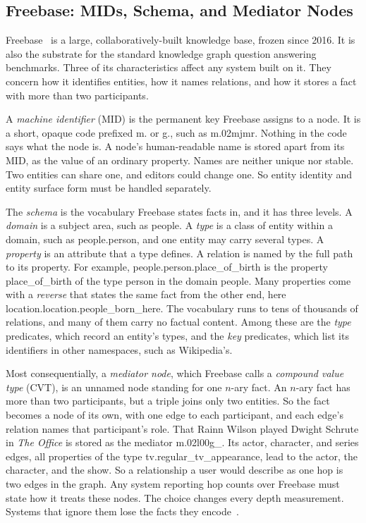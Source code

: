 \subsection{Freebase: MIDs, Schema, and Mediator Nodes}

Freebase~\cite{bollacker2008freebase} is a large, collaboratively-built
knowledge base, frozen since 2016. It is also the substrate for
the standard knowledge graph question answering benchmarks. Three of its
characteristics affect any system built on it. They concern how it identifies
entities, how it names relations, and how it stores a fact with more than two
participants.

A \emph{machine identifier} (MID) is the permanent key Freebase
assigns to a node. It is a short, opaque code prefixed \textsf{m.} or
\textsf{g.}, such as \textsf{m.02mjmr}. Nothing in the code says what the node
is. A node's human-readable name is stored apart from its MID, as the value of
an ordinary property. Names are neither unique nor stable. Two entities can
share one, and editors could change one. So entity identity and entity surface
form must be handled separately.

The \emph{schema} is the vocabulary Freebase states facts in, and
it has three levels. A \emph{domain} is a subject area, such as \textsf{people}.
A \emph{type} is a class of entity within a domain, such as
\textsf{people.person}, and one entity may carry several types. A
\emph{property} is an attribute that a type defines. A relation is named by the
full path to its property. For example, \textsf{people.person.place\_of\_birth}
is the property \textsf{place\_of\_birth} of the type \textsf{person} in the
domain \textsf{people}. Many properties come with a \emph{reverse} that states
the same fact from the other end, here
\textsf{location.location.people\_born\_here}. The vocabulary runs to tens of
thousands of relations, and many of them carry no factual content. Among these
are the \emph{type} predicates, which record an entity's types, and the
\emph{key} predicates, which list its identifiers in other namespaces, such as
Wikipedia's.

Most consequentially, a \emph{mediator node}, which
Freebase calls a \emph{compound value type} (CVT), is an unnamed node standing
for one $n$-ary fact. An $n$-ary fact has more than two participants, but a
triple joins only two entities. So the fact becomes a node of its own, with one
edge to each participant, and each edge's relation names that participant's
role. That Rainn Wilson played Dwight Schrute in \emph{The Office} is stored as
the mediator \textsf{m.02l00g\_}. Its \textsf{actor}, \textsf{character}, and
\textsf{series} edges, all properties of the type
\textsf{tv.regular\_tv\_appearance}, lead to the actor, the character, and the
show. So a relationship a user would describe as one hop is two edges in the
graph. Any system reporting hop counts over Freebase must state how it treats
these nodes. The choice changes every depth measurement. Systems that ignore
them lose the facts they encode~\cite{xu2024generate}.

